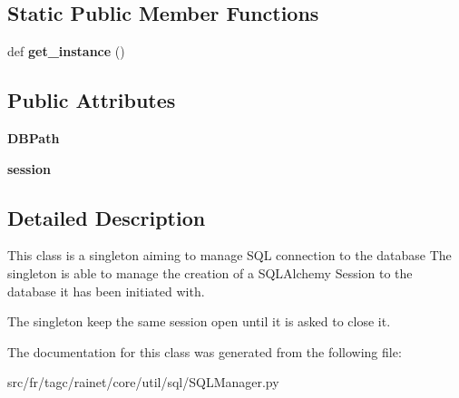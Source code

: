 \subsection*{Static Public Member Functions}
\begin{DoxyCompactItemize}
\item 
\hypertarget{classsrc_1_1fr_1_1tagc_1_1rainet_1_1core_1_1util_1_1sql_1_1SQLManager_1_1SQLManager_a349580aec384b88f90908cd73b50beee}{}def {\bfseries get\+\_\+instance} ()\label{classsrc_1_1fr_1_1tagc_1_1rainet_1_1core_1_1util_1_1sql_1_1SQLManager_1_1SQLManager_a349580aec384b88f90908cd73b50beee}

\end{DoxyCompactItemize}
\subsection*{Public Attributes}
\begin{DoxyCompactItemize}
\item 
\hypertarget{classsrc_1_1fr_1_1tagc_1_1rainet_1_1core_1_1util_1_1sql_1_1SQLManager_1_1SQLManager_af568a3ea5d8f2d3e78caedb78f988730}{}{\bfseries D\+B\+Path}\label{classsrc_1_1fr_1_1tagc_1_1rainet_1_1core_1_1util_1_1sql_1_1SQLManager_1_1SQLManager_af568a3ea5d8f2d3e78caedb78f988730}

\item 
\hypertarget{classsrc_1_1fr_1_1tagc_1_1rainet_1_1core_1_1util_1_1sql_1_1SQLManager_1_1SQLManager_ab6927658c071939b1df8c83865237443}{}{\bfseries session}\label{classsrc_1_1fr_1_1tagc_1_1rainet_1_1core_1_1util_1_1sql_1_1SQLManager_1_1SQLManager_ab6927658c071939b1df8c83865237443}

\end{DoxyCompactItemize}


\subsection{Detailed Description}
This class is a singleton aiming to manage S\+Q\+L connection to the database The singleton is able to manage the creation of a S\+Q\+L\+Alchemy Session to the database it has been initiated with. 

The singleton keep the same session open until it is asked to close it. 

The documentation for this class was generated from the following file\+:\begin{DoxyCompactItemize}
\item 
src/fr/tagc/rainet/core/util/sql/S\+Q\+L\+Manager.\+py\end{DoxyCompactItemize}
